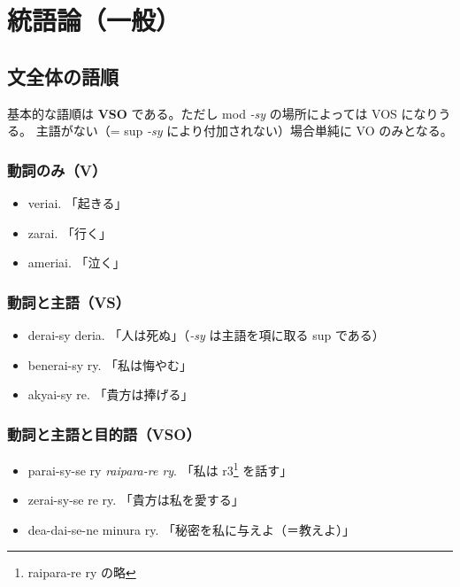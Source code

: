 \section{統語論（一般）}

\subsection{文全体の語順}

基本的な語順は \textbf{VSO} である。ただし mod \emph{-sy} の場所によっては VOS になりうる。
主語がない（= sup \emph{-sy} により付加されない）場合単純に VO のみとなる。

\subsubsection{動詞のみ（V）}

\begin{itemize}
    \item veriai.   「起きる」
    \item zarai.    「行く」
    \item ameriai.  「泣く」
\end{itemize}

\subsubsection{動詞と主語（VS）}
\begin{itemize}
    \item derai-sy deria.   「人は死ぬ」（\emph{-sy} は主語を項に取る sup である）
    \item benerai-sy ry.    「私は悔やむ」
    \item akyai-sy re.      「貴方は捧げる」
\end{itemize}

\subsubsection{動詞と主語と目的語（VSO）}

\begin{itemize}
    \item parai-sy-se ry \emph{raipara-re ry}. 「私は r3\footnote{raipara-re ry の略} を話す」
    \item zerai-sy-se re ry. 「貴方は私を愛する」
    \item dea-dai-se-ne minura ry. 「秘密を私に与えよ（＝教えよ）」
\end{itemize}

